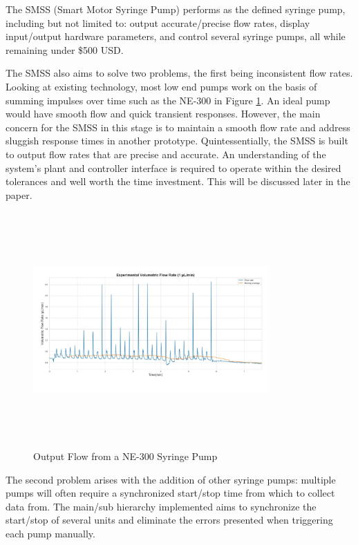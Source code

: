 \documentclass[journal]{IEEEtran}
\begin{document}
        The SMSS (Smart Motor Syringe Pump) performs as the defined syringe pump, including but not limited to: output accurate/precise flow rates, display input/output hardware parameters, and control several syringe pumps, all while remaining under \$500 USD.
        
        The SMSS also aims to solve two problems, the first being inconsistent flow rates. Looking at existing technology, most low end pumps work on the basis of summing impulses over time such as the NE-300 in Figure \ref{fig:baddata_example}. An ideal pump would have smooth flow and quick transient responses. However, the main concern for the SMSS in this stage is to maintain a smooth flow rate and address sluggish response times in another prototype. Quintessentially, the SMSS is built to output flow rates that are precise and accurate. An understanding of the system’s plant and controller interface is required to operate within the desired tolerances and well worth the time investment. This will be discussed later in the paper.
        
         \begin{figure}[H]
            \centering
            \includegraphics[width=9cm, height=9cm]{baddata_example}
            \caption{Output Flow from a NE-300 Syringe Pump \cite{conrads}}
            \label{fig:baddata_example}
        \end{figure}
        
        The second problem arises with the addition of other syringe pumps: multiple pumps will often require a synchronized start/stop time from which to collect data from. The main/sub hierarchy implemented aims to synchronize the start/stop of several units and eliminate the errors presented when triggering each pump manually. 
        
\end{document}
